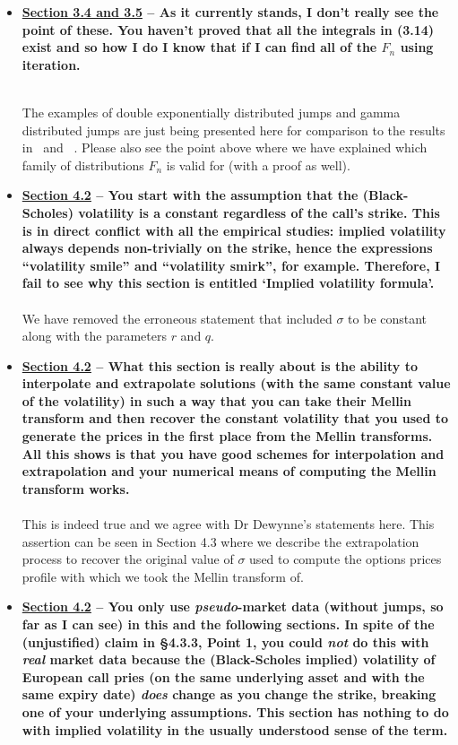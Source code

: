 \documentclass{article}
\begin{document}
\begin{enumerate}
\begin{itemize}
	\item\textbf{\underline{Section 3.4 and 3.5} -- As it currently stands, I don't really see the point of these. You haven't proved that all the integrals in (3.14) exist and so how I do I know that if I can find all of the $F_n$ using iteration. \\ \\ }
	
	The examples of double exponentially distributed jumps and gamma distributed jumps are just being presented here for comparison to the results in~\cite{Kou2002, Kou2004} and ~\cite{Frontczak2013}. Please also see the point above where we have explained which family of distributions $F_n$ is valid for (with a proof as well).
	
	\item\textbf{\underline{Section 4.2} -- You start with the assumption that the (Black-Scholes) volatility is a constant regardless of the call's strike. This is in direct conflict with all the empirical studies: implied volatility always depends non-trivially on the strike, hence the expressions ``volatility smile'' and ``volatility smirk'', for example. Therefore, I fail to see why this section is entitled `Implied volatility formula'.
	\\\\ }
	We have removed the erroneous statement that included $\sigma$ to be constant along with the parameters $r$ and $q$.
	
	\item{\textbf{\underline{Section 4.2} -- What this section is really about is the ability to interpolate and extrapolate solutions (with the same constant value of the volatility) in such a way that you can take their Mellin transform and then recover the constant volatility that you used to generate the prices in the first place from the Mellin transforms. All this shows is that you have good schemes for interpolation and extrapolation and your numerical means of computing the Mellin transform works. \\ \\ }}
	This is indeed true and we agree with Dr Dewynne's statements here. This assertion can be seen in Section 4.3 where we describe the extrapolation process to recover the original value of $\sigma$ used to compute the options prices profile with which we took the Mellin transform of.
	
	\item{\textbf{\underline{Section 4.2} -- You  only use \emph{pseudo}-market data (without jumps, so far as I can see) in this and the following sections. In spite of the (unjustified) claim in \S4.3.3, Point 1, you could \emph{not} do this with \emph{real} market data because the (Black-Scholes implied) volatility of European call pries (on the same underlying asset and with the same expiry date) \emph{does} change as you change the strike, breaking one of your underlying assumptions. This section has nothing to do with implied volatility in the usually understood sense of the term. \\ \\}}
	

\end{itemize}
\end{enumerate}
\end{document}
